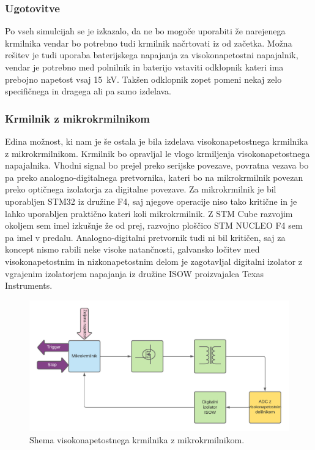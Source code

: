 \documentclass[a4paper,twoside,openright,12pt,slovene]{book}
\begin{document}
    \subsubsection{Ugotovitve} \label{Ugotovitve glede komercialnih krmilnkov}
Po vseh simulcijah se je izkazalo, da ne bo mogoče uporabiti že narejenega krmilnika vendar bo potrebno tudi krmilnik načrtovati iz od začetka. Možna rešitev je tudi uporaba baterijskega napajanja za visokonapetostni napajalnik, vendar je potrebno med polnilnik in baterijo vstaviti odklopnik kateri ima prebojno napetost vsaj \SI{15}{\kilo\volt}. Takšen odklopnik zopet pomeni nekaj zelo specifičnega in dragega ali pa samo izdelava. 

	\subsubsection{Krmilnik z mikrokrmilnikom} \label{KrmilnikzUc}
Edina možnost, ki nam je še ostala je bila izdelava visokonapetostnega krmilnika z mikrokrmilnikom. Krmilnik bo opravljal le vlogo krmiljenja visokonapetostnega napajalnika. Vhodni signal bo prejel preko serijske povezave, povratna vezava bo pa preko analogno-digitalnega pretvornika, kateri bo na mikrokrmilnik povezan preko optičnega izolatorja za digitalne povezave. Za mikrokrmilnik je bil uporabljen STM32 iz družine F4, saj njegove operacije niso tako kritične in je lahko uporabljen praktično kateri koli mikrokrmilnik. Z STM Cube razvojim okoljem sem imel izkušnje že od prej, razvojno ploščico STM NUCLEO F4 sem pa imel v predalu. Analogno-digitalni pretvornik tudi ni bil kritičen, saj za koncept nismo rabili neke visoke natančnosti, galvansko ločitev med visokonapetostnim in nizkonapetostnim delom je zagotavljal digitalni izolator z vgrajenim izolatorjem napajanja iz družine ISOW proizvajalca Texas Instruments. 

	\begin{figure}[h]
    \centering
    \includegraphics[width=1\columnwidth]{Sheme/KrmilnikzuCElShema.pdf}
    \caption{\label{KrmilnikzuCElShema} Shema visokonapetostnega krmilnika z mikrokrmilnikom.}
	\end{figure}
\end{document}
